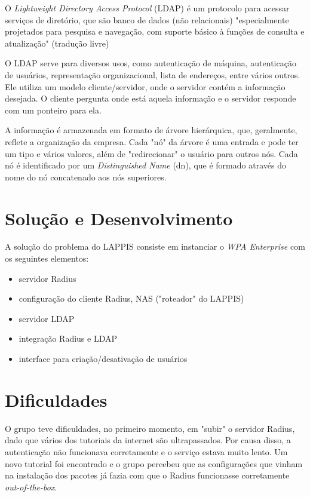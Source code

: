 O \textit{Lightweight Directory Access Protocol} (LDAP) é um protocolo para acessar
serviços de diretório, que são banco de dados (não relacionais) "especialmente
projetados para pesquisa e navegação, com suporte básico à funções de consulta e
atualização" (tradução livre) \cite{openldap}

O LDAP serve para diversos usos, como autenticação de máquina, autenticação de usuários,
representação organizacional, lista de endereços, entre vários outros. Ele utiliza
um modelo cliente/servidor, onde o servidor contém a informação desejada. O cliente
pergunta onde está aquela informação e o servidor responde com um ponteiro para ela.\cite{openldap}

A informação é armazenada em formato de árvore hierárquica, que, geralmente, reflete
a organização da empresa. Cada "nó" da árvore é uma entrada e pode ter um tipo e vários
valores, além de "redirecionar" o usuário para outros nós. Cada nó é identificado
por um \textit{Distinguished Name} (dn), que é formado através do nome do nó concatenado
aos nós superiores.\cite{openldap}


\section{Solução e Desenvolvimento}

A solução do problema do LAPPIS consiste em instanciar o \textit{WPA Enterprise}
com os seguintes elementos:

\begin{itemize}
    \item servidor Radius
    \item configuração do cliente Radius, NAS ("roteador" do LAPPIS)
    \item servidor LDAP
    \item integração Radius e LDAP
    \item interface para criação/desativação de usuários
\end{itemize}

\section{Dificuldades}

O grupo teve dificuldades, no primeiro momento, em "subir" o servidor Radius,
dado que vários dos tutoriais da internet são ultrapassados. Por causa disso,
a autenticação não funcionava corretamente e o serviço estava muito lento.
Um novo tutorial foi encontrado e o grupo percebeu que as configurações que
vinham na instalação dos pacotes já fazia com que o Radius funcionasse corretamente
\textit{out-of-the-box}.

